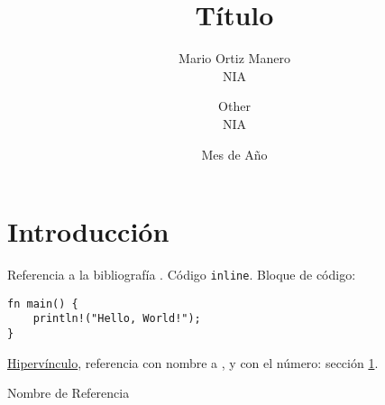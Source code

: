 \documentclass{article}
\title{Título}
\author{Mario Ortiz Manero\\NIA \and Other\\NIA}
\date{Mes de Año}
\newcommand{\code}[1] {\texttt{#1}}
\begin{document}
\maketitle
\newpage

\bigskip

\setcounter{tocdepth}{2}
\tableofcontents
\newpage

\setlength{\parskip}{0.75em}



\section{Introducción} \label{intro}
Referencia a la bibliografía \cite{nombre}. Código \code{inline}. Bloque de
código:

\begin{verbatim}
fn main() {
    println!("Hello, World!");
}
\end{verbatim}

\href{https://google.com/}{Hipervínculo}, referencia con nombre a
, y con el número: sección \ref{intro}.

\newpage
\begin{thebibliography}{9} \label{bibliografia}
 Nombre de Referencia
\end{thebibliography}
\end{document}
